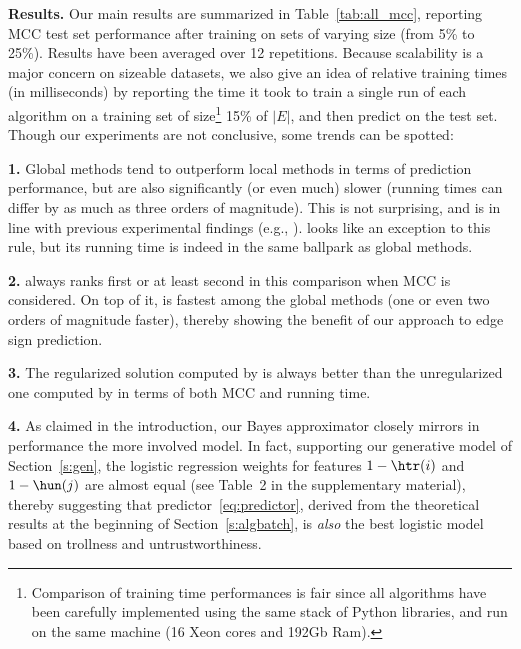 {\bf Results.} Our main results are summarized in Table~\ref{tab:all_mcc}, reporting MCC test set performance after training on sets of varying size (from 5\% to 25\%). Results have been averaged over 12 repetitions. Because scalability is a major concern 
on sizeable datasets, we also give an idea of relative training times (in milliseconds) by reporting the time it took to train a single run of each algorithm on a training set of size\footnote
{
Comparison of training time performances is fair since all algorithms have been carefully implemented using the same stack of Python libraries, and run on the same machine (16 Xeon cores and 192Gb Ram).
} 
15\% of $|E|$, and then predict on the test set. Though our experiments are not conclusive, some trends can be 
spotted:
%
%

{\bf 1.}
Global methods tend to outperform local methods in terms of prediction performance, but are also significantly (or even much) slower (running times can differ by as much as three orders of magnitude). This is not surprising, and is in line with previous experimental findings (e.g., \cite{shahriari2014ranking,wu2016troll}). \compbayesian{} looks like an exception to this rule, but its running time is indeed in the same ballpark as global methods.
%

{\bf 2.} 
\uslpropGsec{} always ranks first or at least second in this comparison when MCC is considered. On top of it, \uslpropGsec{} is fastest among the global methods (one or even two orders of magnitude faster), thereby showing the benefit of our approach to edge sign prediction.

{\bf 3.} The regularized solution computed by \uslpropGsec{} is always better than the unregularized one computed by \qoptim{} in terms of both MCC and running time.

{\bf 4.} 
As claimed in the introduction, our Bayes approximator \usrule{} closely mirrors in performance the more involved \uslogregp{} model. In fact, supporting our generative model of Section~\ref{s:gen}, the logistic regression weights for features $1-\htr(i)$ and $1-\hun(j)$ are almost equal (see Table~2 in the supplementary material), thereby suggesting that predictor~\eqref{eq:predictor}, derived from the theoretical results at the beginning of Section~\ref{s:algbatch}, is {\em also} the best logistic model based on trollness and untrustworthiness.
%


